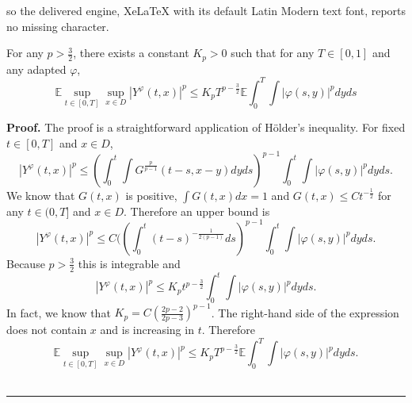 \documentclass[10pt,a4paper]{amsart}
\newenvironment{proof}[1][Proof]{\noindent\textbf{#1.} }{\ \rule{0.5em}{0.5em}}
\begin{document}
so the delivered engine, XeLaTeX with its default Latin Modern text font, reports no missing character.
\begin{theorem} \label{thm:Leb}
	For any $p>\frac{3}{2}$, there exists a constant $K_p>0$ such that for any $T\in [0,1]$ and any adapted $\varphi$,
	\begin{equation}
		\mathbb{E} \sup_{t \in [0,T]} \sup_{x \in D} |Y^{\varphi}(t,x)|^p \leq K_p T^{p-\frac{3}{2}} \mathbb{E}\int_0^T \int |\varphi(s,y)|^pdyds
	\end{equation}
\end{theorem}

\begin{proof}
	The proof is a straightforward application of H\"older's inequality. For fixed $t \in [0,T]$ and $x \in D$,
	\begin{equation}
		|Y^{\varphi}(t,x)|^p \leq \left(\int_0^t\int G^{\frac{p}{p-1}}(t-s,x-y)dyds\right)^{p-1}\int_0^t \int |\varphi(s,y)|^pdyds.
	\end{equation}
	We know that $G(t,x)$ is positive, $\int G(t,x)dx =1$ and $G(t,x)\leq Ct^{-\frac{1}{2}}$ for any $t\in(0,T]$ and $x\in D$. Therefore an upper bound is
	\begin{equation}
		|Y^{\varphi}(t,x)|^p \leq C(\left(\int_0^t (t-s)^{-\frac{1}{2(p-1)}}ds\right)^{p-1}\int_0^t \int |\varphi(s,y)|^pdyds.
	\end{equation}
	Because $p>\frac{3}{2}$ this is integrable and
	\begin{equation}
		|Y^{\varphi}(t,x)|^p \leq K_p t^{p-\frac{3}{2}}\int_0^t \int |\varphi(s,y)|^pdyds.
	\end{equation}
	In fact, we know that $K_p = C\left(\frac{2p-2}{2p-3}\right)^{p-1}$.
	The right-hand side of the expression does not contain $x$ and is increasing in $t$. Therefore
	\begin{equation}
		\mathbb{E} \sup_{t \in [0,T]} \sup_{x \in D} |Y^{\varphi}(t,x)|^p \leq K_p T^{p-\frac{3}{2}} \mathbb{E} \int_0^T \int |\varphi(s,y)|^pdyds.
	\end{equation}
\end{proof}
\end{document}
